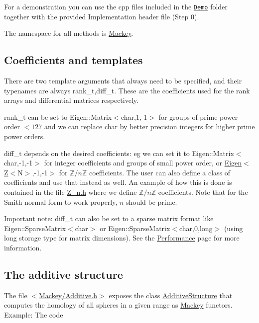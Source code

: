 For a demonstration you can use the cpp files included in the \href{https://github.com/NickG-Math/Mackey/tree/master/Demo}{\tt Demo} folder together with the provided Implementation header file (Step 0).

The namespace for all methods is {\ttfamily \hyperlink{namespaceMackey}{Mackey}}.\hypertarget{use_coeff}{}\subsection{Coefficients and templates}\label{use_coeff}
There are two template arguments that always need to be specified, and their typenames are always {\ttfamily rank\+\_\+t,diff\+\_\+t}. These are the coefficients used for the rank arrays and differential matrices respectively.


\begin{DoxyItemize}
\item {\ttfamily rank\+\_\+t} can be set to {\ttfamily Eigen\+::\+Matrix$<$char,1,-\/1$>$} for groups of prime power order $<127$ and we can replace {\ttfamily char} by better precision integers for higher prime power orders.
\item {\ttfamily diff\+\_\+t} depends on the desired coefficients\+: eg we can set it to {\ttfamily Eigen\+::\+Matrix$<$char,-\/1,-\/1$>$} for integer coefficients and groups of small power order, or {\ttfamily \hyperlink{namespaceEigen}{Eigen}$<$\hyperlink{classZ}{Z}$<$N$>$,-\/1,-\/1$>$} for $\mathbb Z/n\mathbb Z$ coefficients. The user can also define a class of coefficients and use that instead as well. An example of how this is done is contained in the file {\ttfamily \hyperlink{Z__n_8h}{Z\+\_\+n.\+h}} where we define $\mathbb Z/n\mathbb Z$ coefficients. Note that for the Smith normal form to work properly, $n$ should be prime.
\end{DoxyItemize}

Important note\+: {\ttfamily diff\+\_\+t} can also be set to a sparse matrix format like {\ttfamily Eigen\+::\+Sparse\+Matrix$<$char$>$} or {\ttfamily Eigen\+::\+Sparse\+Matrix$<$char,0,long$>$} (using {\ttfamily long} storage type for matrix dimensions). See the \hyperlink{perf}{Performance} page for more information. \hypertarget{use_step1add}{}\subsection{The additive structure}\label{use_step1add}
The file {\ttfamily $<$\hyperlink{Additive_8h}{Mackey/\+Additive.\+h}$>$} exposes the class \hyperlink{classMackey_1_1AdditiveStructure}{Additive\+Structure} that computes the homology of all spheres in a given range as \hyperlink{namespaceMackey}{Mackey} functors. Example\+: The code

